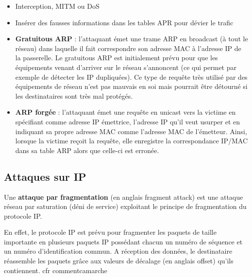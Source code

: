 \documentclass{report}
\begin{document}
\begin{itemize}
    \item Interception, MITM ou DoS
    \item Insérer des fausses informations dans les tables APR pour dévier le trafic
    \item  \textbf{Gratuitous ARP} : l'attaquant émet une trame ARP en broadcast (à tout le réseau) dans laquelle il fait correspondre son adresse MAC à l'adresse IP de la passerelle. Le gratuitous ARP est initialement prévu pour que les équipements venant d'arriver sur le réseau s'annoncent (ce qui permet par exemple de détecter les IP dupliquées). Ce type de requête très utilisé par des équipements de réseau n'est pas mauvais en soi mais pourrait être détourné si les destinataires sont très mal protégés.
    \item \textbf{ARP forgée} : l'attaquant émet une requête en unicast vers la victime en spécifiant comme adresse IP émettrice, l'adresse IP qu'il veut usurper et en indiquant sa propre adresse MAC comme l'adresse MAC de l'émetteur. Ainsi, lorsque la victime reçoit la requête, elle enregistre la correspondance IP/MAC dans sa table ARP alors que celle-ci est erronée.
\end{itemize}

\subsection{Attaques sur IP}

Une \textbf{attaque par fragmentation} (en anglais fragment attack) est une attaque réseau par saturation (déni de service) exploitant le principe de fragmentation du protocole IP.

En effet, le protocole IP est prévu pour fragmenter les paquets de taille importante en plusieurs paquets IP possédant chacun un numéro de séquence et un numéro d'identification commun. A réception des données, le destinataire réassemble les paquets grâce aux valeurs de décalage (en anglais offset) qu'ils contiennent. cfr commentcamarche
\end{document}
